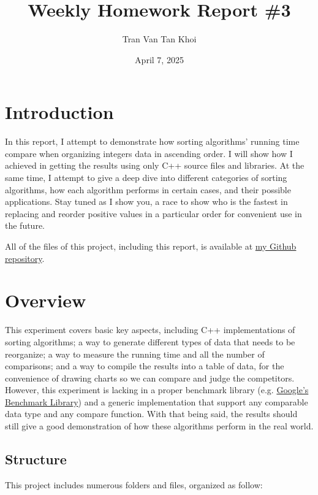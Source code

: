 \documentclass{article}
\author{Tran Van Tan Khoi}
\title{Weekly Homework Report \#3}
\date{April 7, 2025}
\begin{document}
\maketitle

\section{Introduction}
\label{introduction}

In this report, I attempt to demonstrate how sorting algorithms' running time compare when organizing integers data in ascending order. I will show how I achieved in getting the results using only C++ source files and libraries. At the same time, I attempt to give a deep dive into different categories of sorting algorithms, how each algorithm performs in certain cases, and their possible applications. Stay tuned as I show you, a race to show who is the fastest in replacing and reorder positive values in a particular order for convenient use in the future.

All of the files of this project, including this report, is available at \href{https://github.com/xtrkoi/throwaway-rep}{my Github repository}.


\section{Overview}
\label{overview}

This experiment covers basic key aspects, including C++ implementations of sorting algorithms; a way to generate different types of data that needs to be reorganize; a way to measure the running time and all the number of comparisons; and a way to compile the results into a table of data, for the convenience of drawing charts so we can compare and judge the competitors. However, this experiment is lacking in a proper benchmark library (e.g. \href{https://github.com/google/benchmark}{Google's Benchmark Library}) and a generic implementation that support any comparable data type and any compare function. With that being said, the results should still give a good demonstration of how these algorithms perform in the real world.


\subsection{Structure}
\label{stucture}

This project includes numerous folders and files, organized as follow:
\end{document}
